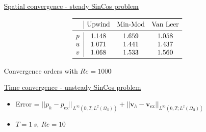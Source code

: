 \documentclass{beamer}
\begin{document}
\begin{frame}{\hyperlink{spaceconvSupp}{Spatial convergence - 
		steady SinCos problem}}
\vspace{-0.8cm}
\begin{figure}
	\centering
	\subfloat[\tiny Figure: Upwind, 
	$Re=1000$]{\hspace{-0.5cm}}
	\subfloat[\tiny Figure: Min-Mod, 
	$Re=1000$]{}
\end{figure}
\vspace{-0.3cm}
\begin{table}\footnotesize
	\[
	\begin{array}{c|ccc}
	\toprule
	& \text{Upwind} & \text{Min-Mod} & \text{Van Leer} \\ 
	\midrule
	p & 1.148 & 1.659 & 1.058\\
	u & 1.071 & 1.441 & 1.437\\
	v & 1.068 & 1.533 & 1.560\\
	\bottomrule
	\end{array}
	\]
	\caption{\tiny Convergence orders with $Re = 1000$}
\end{table}
\end{frame}
\begin{frame}[label=timeconv]{\hyperlink{timeconvSupp}{Time convergence - 
unsteady SinCos problem}}
\begin{figure}
	\centering
	
\end{figure}
\vspace{-0.3cm}
\begin{itemize}
\item Error = $|\!|p_h - p_\text{ex}|\!|_{L^\infty(0,T;L^2(\Omega_\text{ff}))} 
+ |\!|\mathbf{v}_h - 
\mathbf{v}_\text{ex}|\!|_{L^\infty(0,T;L^2(\Omega_\text{ff}))}$
\item $T = \SI{1}{s}$, $Re=10$
\end{itemize}
\end{frame}
\end{document}
